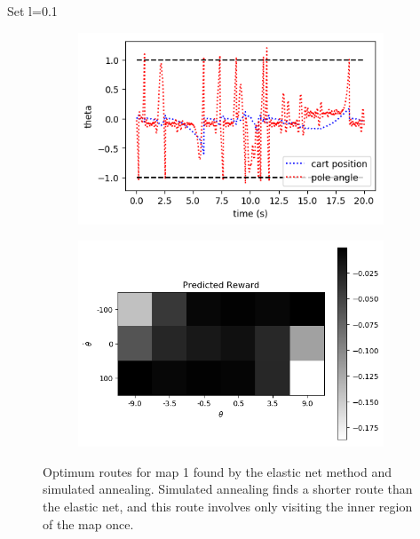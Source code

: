 \documentclass{article}
\begin{document}
Set l=0.1


\begin{figure}[h]
	\centering
	\begin{subfigure}[t]{0.28\linewidth}
		\centering
		\includegraphics[width = 1.0\linewidth, trim={0 0 0 0}, clip=true]{figures/learn1000_xs_thetas.png}
		\label{fig:comp1el}	
	\end{subfigure}%
	\hspace{0.1\linewidth}
	\begin{subfigure}[t]{0.28\linewidth}
		\centering
		\includegraphics[width = 1.0\linewidth, trim={0 0 0 0}, clip=true]{figures/learnvs_vs.png}
		\label{fig:comp1an}	
	\end{subfigure}
\caption{Optimum routes for map 1 found by the elastic net method and simulated annealing. Simulated annealing finds a shorter route than the elastic net, and this route involves only visiting the inner region of the map once. }
\label{fig:comp1}
\end{figure}
\end{document}
